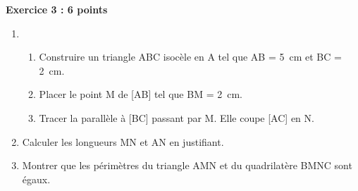 \textbf{Exercice  3 : \hfill 6 points}

\medskip 

\begin{enumerate}
\item 
	\begin{enumerate}
		\item Construire un triangle ABC isocèle en A tel que AB = 5~cm et BC = 2~cm. 
		\item Placer le point M de [AB] tel que BM = 2~cm. 
		\item Tracer la parallèle à [BC] passant par M. Elle coupe [AC] en N. 
	\end{enumerate}
\item Calculer les longueurs MN et AN en justifiant. 
\item Montrer que les périmètres du triangle AMN et du quadrilatère BMNC sont égaux. 
\end{enumerate}

\vspace{0,5cm}

